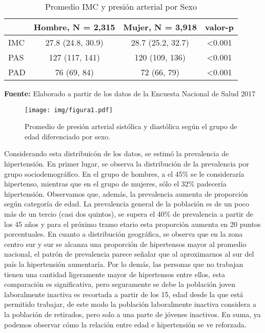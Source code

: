 \documentclass{aa}
\begin{document}
\begin{table}
\caption{\small Promedio IMC y presión arterial por Sexo}
    \hspace{-4mm}
    \centering
    \tiny
\begin{tabular}{lccc}
\toprule
\textbf{ } & \textbf{Hombre}, N = 2,315 & \textbf{Mujer}, N = 3,918 & valor-p \\ 
\midrule
IMC & 27.8 (24.8, 30.9) & 28.7 (25.2, 32.7) & <0.001 \\ 
PAS & 127 (117, 141) & 120 (109, 136) & <0.001 \\ 
PAD & 76 (69, 84) & 72 (66, 79) & <0.001 \\ 
 \bottomrule
\end{tabular}
    \vspace{1ex}
    
    {\raggedright \small \textbf{Fuente:} Elaborado a partir de los datos de la Encuesta Nacional de Salud 2017 \par}
\end{table}

\begin{figure}
\centering
  \texttt{[image: img/figura1.pdf]}
  \caption{Promedio de presión arterial sistólica y diastólica según el grupo de edad diferenciado por sexo.}
\end{figure}

Considerando esta distribuicón de los datos, se estimó la prevalencia de hipertensión. En primer lugar, se observa la distribución de la prevalencia por grupo sociodemográfico. En el grupo de hombres, a el 45\% se le consideraría hipertenso, mientras que en el grupo de mujeres, sólo el 32\% padecería hipertensión. Observamos que, además, la prevalencia aumenta de proporción según categoría de edad. La prevalencia general de la población es de un poco más de un tercio (casi dos quintos), se supera el 40\% de prevalencia a partir de los 45 años y para el próximo tramo etario esta proporción aumenta en 20 puntos porcentuales. En cuanto a distribución geográfica, se observa que en la zona centro sur y sur se alcanza una proporción de hipertensos mayor al promedio nacional, el patrón de prevalencia parece señalar que al aproximarnos al sur del país la hipertensión aumentaría. Por lo demás, las personas que no trabajan tienen una cantidad ligeramente mayor de hipertensos entre ellos, esta comparación es significativa, pero seguramente se debe la población joven laboralmente inactiva es recortada a partir de los 15, edad desde la que está permitido trabajar, de este modo la población laboralmente inactiva considera a la población de retirados, pero solo a una parte de jóvenes inactivos. En suma, ya podemos observar cómo la relación entre edad e hipertensión se ve reforzada.
\end{document}

